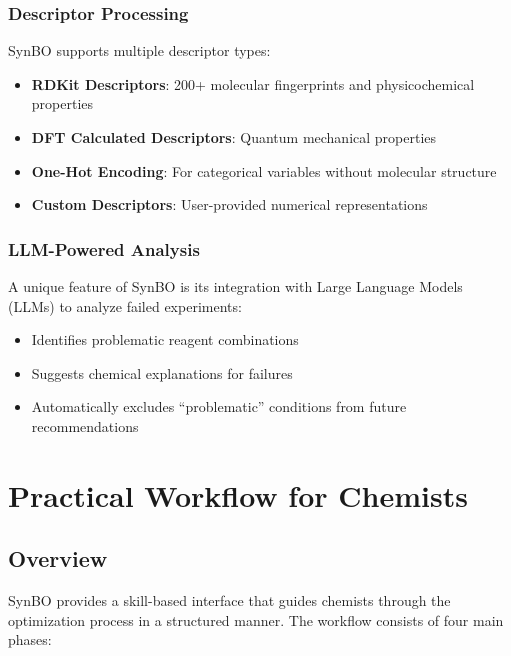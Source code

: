 \documentclass[12pt,a4paper]{article}
\begin{document}
\subsubsection{Descriptor Processing}

SynBO supports multiple descriptor types:

\begin{itemize}
    \item \textbf{RDKit Descriptors}: 200+ molecular fingerprints and physicochemical properties
    \item \textbf{DFT Calculated Descriptors}: Quantum mechanical properties
    \item \textbf{One-Hot Encoding}: For categorical variables without molecular structure
    \item \textbf{Custom Descriptors}: User-provided numerical representations
\end{itemize}

\subsubsection{LLM-Powered Analysis}

A unique feature of SynBO is its integration with Large Language Models (LLMs) to analyze failed experiments:

\begin{itemize}
    \item Identifies problematic reagent combinations
    \item Suggests chemical explanations for failures
    \item Automatically excludes ``problematic'' conditions from future recommendations
\end{itemize}

\section{Practical Workflow for Chemists}
\label{sec:workflow}

\subsection{Overview}

SynBO provides a skill-based interface that guides chemists through the optimization process in a structured manner. The workflow consists of four main phases:
\end{document}
